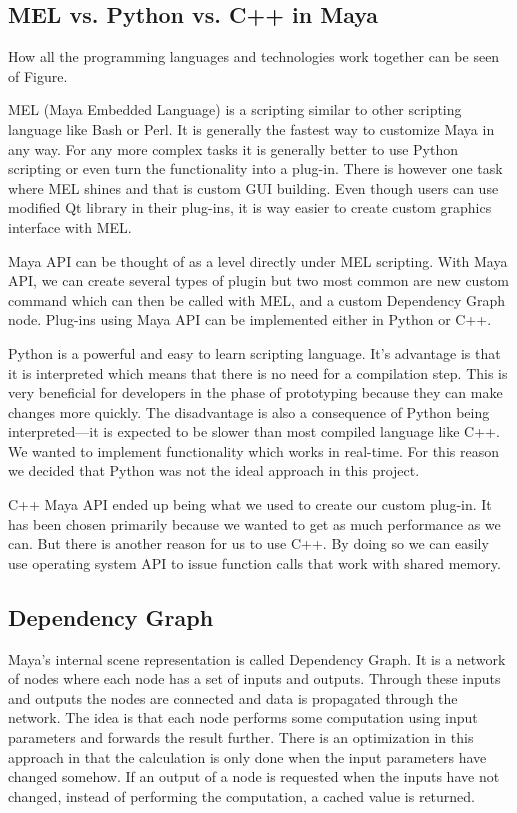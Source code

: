 \documentclass[
  digital, %
  table,   %
  nolof,     %
  nolot,     %
]{fithesis3}
\begin{document}

\subsection{MEL vs. Python vs. C++ in Maya}
How all the programming languages and technologies work together can be seen of Figure.

MEL (Maya Embedded Language) is a scripting similar to other scripting language like Bash or Perl. It is generally the fastest way to customize Maya in any way. For any more complex tasks it is generally better to use Python scripting or even turn the functionality into a plug-in. There is however one task where MEL shines and that is custom GUI building. Even though users can use modified Qt library in their plug-ins, it is way easier to create custom graphics interface with MEL.

Maya API can be thought of as a level directly under MEL scripting. With Maya API, we can create several types of plugin but two most common are new custom command which can then be called with MEL, and a custom Dependency Graph node. Plug-ins using Maya API can be implemented either in Python or C++.

Python is a powerful and easy to learn scripting language. It's advantage is that it is interpreted which means that there is no need for a compilation step. This is very beneficial for developers in the phase of prototyping because they can make changes more quickly. The disadvantage is also a consequence of Python being interpreted—it is expected to be slower than most compiled language like C++. We wanted to implement functionality which works in real-time. For this reason we decided that Python was not the ideal approach in this project.

C++ Maya API ended up being what we used to create our custom plug-in. It has been chosen primarily because we wanted to get as much performance as we can. But there is another reason for us to use C++. By doing so we can easily use operating system API to issue function calls that work with shared memory.

\subsection{Dependency Graph}
Maya's internal scene representation is called Dependency Graph. It is a network of nodes where each node has a set of inputs and outputs. Through these inputs and outputs the nodes are connected and data is propagated through the network. The idea is that each node performs some computation using input parameters and forwards the result further. There is an optimization in this approach in that the calculation is only done when the input parameters have changed somehow. If an output of a node is requested when the inputs have not changed, instead of performing the computation, a cached value is returned.
\end{document}
